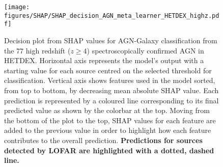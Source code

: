 \documentclass{aa}
\begin{document}
\begin{figure}[t]
    \centering
    \begin{minipage}{0.75\columnwidth}
    \texttt{[image: figures/SHAP/SHAP\_decision\_AGN\_meta\_learner\_HETDEX\_highz.pdf]}
    \end{minipage}%
    \caption{Decision plot from SHAP values for AGN-Galaxy classification from the $77$ high redshift ($z \geq 4$) spectroscopically confirmed AGN in HETDEX. Horizontal axis represents the model's output with a starting value for each source centred on the selected threshold for classification. Vertical axis shows features used in the model sorted, from top to bottom, by decreasing mean absolute SHAP value. Each prediction is represented by a coloured line corresponding to its final predicted value as shown by the colorbar at the top. Moving from the bottom of the plot to the top, SHAP values for each feature are added to the previous value in order to highlight how each feature contributes to the overall prediction. \textbf{Predictions for sources detected by LOFAR are highlighted with a dotted, dashed line.}}
   \label{fig:SHAP_decision_AGN_meta_HETDEX_high_z}
\end{figure}
\end{document}
